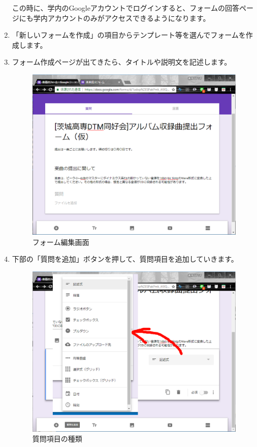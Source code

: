 \documentclass[11pt,a4paper]{jsarticle}
\begin{document}
\begin{enumerate}
                        この時に、学内のGoogleアカウントでログインすると、フォームの回答ページにも学内アカウントのみがアクセスできるようになります。
                \item 「新しいフォームを作成」の項目からテンプレート等を選んでフォームを作成します。
                \item フォーム作成ページが出てきたら、タイトルや説明文を記述します。
                    \begin{figure}[htbp]
                        \begin{center}
                        \includegraphics[width=12.0cm]{./image/form02.eps}
                        \caption{フォーム編集画面}
                        \label{fig:form02}
                        \end{center}
                    \end{figure}
                \item 下部の「質問を追加」ボタンを押して、質問項目を追加していきます。
                    \begin{figure}[htbp]
                        \begin{center}
                        \includegraphics[width=12.0cm]{./image/form03.eps}
                        \caption{質問項目の種類}
                        \label{fig:form03}
                        \end{center}
                    \end{figure}
                    

\end{enumerate}
\end{document}
